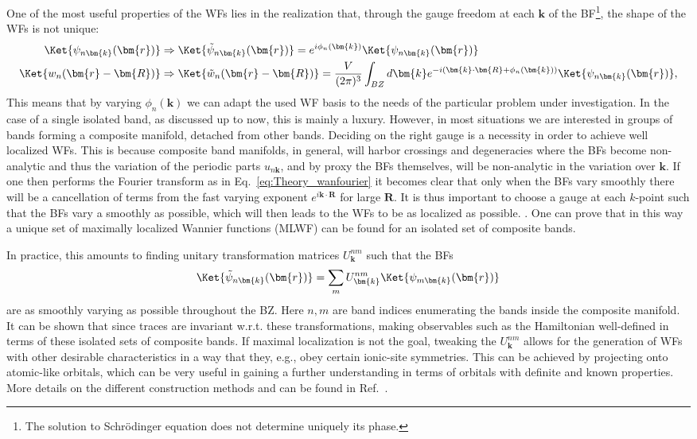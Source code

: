 One of the most useful properties of the WFs lies in the realization that, through the gauge freedom at each $\bm{k}$ of the BF\footnote{The solution to Schr\"odinger equation does not determine uniquely its phase.}, the shape of the WFs is not unique:
\begin{align}
	\Ket{\psi_{n\bm{k}}(\bm{r})} &\Rightarrow \Ket{\tilde{\psi}_{n\bm{k}}(\bm{r})} = e^{i \phi_n(\bm{k})} \Ket{\psi_{n\bm{k}}(\bm{r})} \\
	\Ket{w_{n}(\bm{r} - \bm{R})} &\Rightarrow \Ket{\tilde{w}_{n}(\bm{r} - \bm{R})} = \frac{V}{(2\pi)^3} \int_{BZ} d \bm{k} e^{-i (\bm{k} \cdot \bm{R} + \phi_n(\bm{k}))} \Ket{\psi_{n\bm{k}}(\bm{r})},
\end{align}
This means that by varying $\phi_n(\bm{k})$ we can adapt the used WF basis to the needs of the particular problem under investigation.
In the case of a single isolated band, as discussed up to now, this is mainly a luxury. However, in most situations we are interested in groups of bands forming a composite manifold, detached from other bands.
Deciding on the right gauge is a necessity in order to achieve well localized WFs.
This is because composite band manifolds, in general, will harbor crossings and degeneracies where the BFs become non-analytic and thus the variation of the periodic parts $u_{n\bm{k}}$, and by proxy the BFs themselves, will be non-analytic in the variation over $\bm{k}$.
If one then performs the Fourier transform as in Eq.~\ref{eq:Theory_wanfourier} it becomes clear that only when the BFs vary smoothly there will be a cancellation of terms from the fast varying exponent $e^{i \bm{k}\cdot \bm{R}}$ for large $\bm{R}$.
It is thus important to choose a gauge at each $k$-point such that the BFs vary a smoothly as possible, which will then leads to the WFs to be as localized as possible. .
One can prove \cite{Kunes2004, Marzari2012} that in this way a unique set of maximally localized Wannier functions (MLWF) can be found for an isolated set of composite bands.

In practice, this amounts to finding unitary transformation matrices $U^{nm}_{\bm{k}}$ such that the BFs
\begin{equation}
	\Ket{\tilde{\psi}_{n\bm{k}}(\bm{r})} = \sum_m U^{nm}_{\bm{k}} \Ket{\psi_{m\bm{k}}(\bm{r})}
\end{equation}
are as smoothly varying as possible throughout the BZ.
Here $n,m$ are band indices enumerating the bands inside the composite manifold.
It can be shown that since traces are invariant w.r.t. these transformations, making observables such as the Hamiltonian well-defined in terms of these isolated sets of composite bands.
If maximal localization is not the goal, tweaking the $U^{nm}_{\bm{k}}$ allows for the generation of WFs with other desirable characteristics in a way that they, e.g., obey certain ionic-site symmetries.
This can be achieved by projecting onto atomic-like orbitals, which can be very useful in gaining a further understanding in terms of orbitals with definite and known properties.
More details on the different construction methods and can be found in Ref.~\cite{Marzari2012}.


